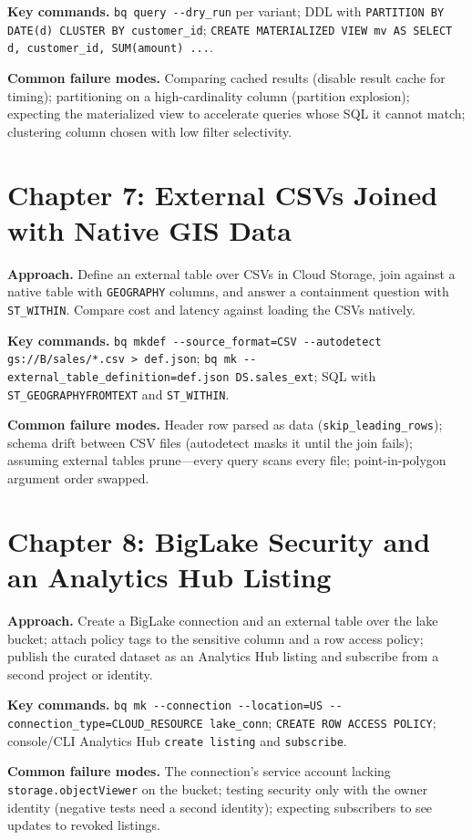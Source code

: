 \textbf{Key commands.} \texttt{bq query -{}-dry\_run} per variant; DDL with \texttt{PARTITION BY
DATE(d) CLUSTER BY customer\_id}; \texttt{CREATE MATERIALIZED VIEW mv AS SELECT d, customer\_id,
SUM(amount) ...}.

\textbf{Common failure modes.} Comparing cached results (disable result cache for timing);
partitioning on a high-cardinality column (partition explosion); expecting the materialized view to
accelerate queries whose SQL it cannot match; clustering column chosen with low filter selectivity.

\section{Chapter 7: External CSVs Joined with Native GIS Data}
\textbf{Approach.} Define an external table over CSVs in Cloud Storage, join against a native
table with \texttt{GEOGRAPHY} columns, and answer a containment question with \texttt{ST\_WITHIN}.
Compare cost and latency against loading the CSVs natively.

\textbf{Key commands.} \texttt{bq mkdef -{}-source\_format=CSV -{}-autodetect gs://B/sales/*.csv >
def.json}; \texttt{bq mk -{}-external\_table\_definition=def.json DS.sales\_ext}; SQL with
\texttt{ST\_GEOGRAPHYFROMTEXT} and \texttt{ST\_WITHIN}.

\textbf{Common failure modes.} Header row parsed as data (\texttt{skip\_leading\_rows}); schema
drift between CSV files (autodetect masks it until the join fails); assuming external tables
prune---every query scans every file; point-in-polygon argument order swapped.

\section{Chapter 8: BigLake Security and an Analytics Hub Listing}
\textbf{Approach.} Create a BigLake connection and an external table over the lake bucket; attach
policy tags to the sensitive column and a row access policy; publish the curated dataset as an
Analytics Hub listing and subscribe from a second project or identity.

\textbf{Key commands.} \texttt{bq mk -{}-connection -{}-location=US -{}-connection\_type=CLOUD\_RESOURCE
lake\_conn}; \texttt{CREATE ROW ACCESS POLICY}; console/CLI Analytics Hub \texttt{create listing}
and \texttt{subscribe}.

\textbf{Common failure modes.} The connection's service account lacking \texttt{storage.objectViewer}
on the bucket; testing security only with the owner identity (negative tests need a second
identity); expecting subscribers to see updates to revoked listings.


